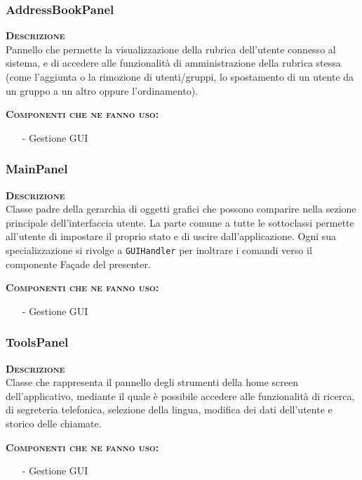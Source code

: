 \subsubsection{AddressBookPanel}
\begin{description}
  \item{\scshape\bfseries Descrizione}\\
Pannello che permette la visualizzazione della rubrica dell'utente connesso al sistema, e di accedere alle funzionalità di amministrazione della rubrica stessa (come l'aggiunta o la rimozione di utenti/gruppi, lo spostamento di un utente da un gruppo a un altro oppure l'ordinamento).
  \item{\scshape\bfseries Componenti che ne fanno uso:}
  \begin{itemize}[noitemsep,nolistsep]
    \item[-] Gestione GUI
  \end{itemize}
\end{description}

\subsubsection{MainPanel}
\begin{description}
  \item{\scshape\bfseries Descrizione}\\
Classe padre della gerarchia di oggetti grafici che possono comparire nella sezione principale dell'interfaccia utente. La parte comune a tutte le sottoclassi permette all'utente di impostare il proprio stato e di uscire dall'applicazione. Ogni sua specializzazione si rivolge a \texttt{GUIHandler} per inoltrare i comandi verso il componente Façade del presenter.
  \item{\scshape\bfseries Componenti che ne fanno uso:}
  \begin{itemize}[noitemsep,nolistsep]
    \item[-] Gestione GUI
  \end{itemize}
\end{description}

\subsubsection{ToolsPanel}
\begin{description}
  \item{\scshape\bfseries Descrizione}\\
Classe che rappresenta il pannello degli strumenti della home screen dell'applicativo, mediante il quale è possibile accedere alle funzionalità di ricerca, di segreteria telefonica, selezione della lingua, modifica dei dati dell'utente e storico delle chiamate.
  \item{\scshape\bfseries Componenti che ne fanno uso:}
  \begin{itemize}[noitemsep,nolistsep]
    \item[-] Gestione GUI
  \end{itemize}
\end{description}

